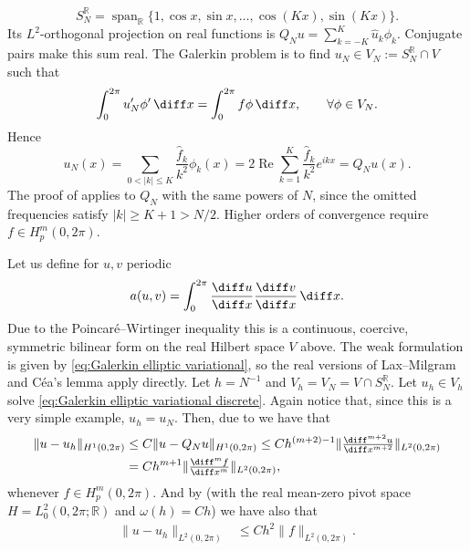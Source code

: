 \begin{example}
\begin{equation*}
        S_N^{\mathbb R}=\operatorname{span}_{\mathbb R}\{1,\cos x,\sin x,\dots,\cos(Kx),\sin(Kx)\}.
    \end{equation*}
    Its $L^2$-orthogonal projection on real functions is $Q_Nu=\sum_{k=-K}^K\hat u_k\phi_k$. Conjugate pairs make this sum real. The Galerkin problem is to find $u_N\in V_N:=S_N^{\mathbb R}\cap V$ such that
    \begin{equation*}
        \int_0^{2\pi}u_N'\phi'\,\diff x=\int_0^{2\pi}f\phi\,\diff x,
        \qquad\forall\phi\in V_N.
    \end{equation*}
    Hence
    \begin{equation*}
        u_N(x)=\sum_{0<|k|\le K}\frac{\hat f_k}{k^2}\phi_k(x)
        =2\operatorname{Re}\sum_{k=1}^K\frac{\hat f_k}{k^2}e^{ikx}=Q_Nu(x).
    \end{equation*}
    The proof of  applies to $Q_N$ with the same powers of $N$, since the omitted frequencies satisfy $|k|\ge K+1>N/2$.
    Higher orders of convergence require $f \in H^m_p(0,2\pi)$.
\end{example}

\begin{remark}
    Let us define for $u,v$ periodic
    \begin{equation*}
        a(u,v) = \int_0^{2\pi} \frac{\diff u}{\diff x}\frac{\diff v}{\diff x}\,\diff x.
    \end{equation*}
    Due to the Poincaré--Wirtinger inequality this is a continuous, coercive, symmetric bilinear form on the real Hilbert space $V$ above. The weak formulation is given by \eqref{eq:Galerkin elliptic variational}, so the real versions of Lax--Milgram and Céa's lemma apply directly.
    Let $h=N^{-1}$ and $V_h=V_N=V\cap S_N^{\mathbb R}$.
    Let $u_h \in V_h$ solve \eqref{eq:Galerkin elliptic variational discrete}.
    Again notice that, since this is a very simple example, $u_h = u_N$.
    Then, due to  we have that
    \begin{align*}
        \|u - u_h\|_{H^1(0,2\pi)} & \le C \|u - Q_Nu\|_{H^1(0,2\pi)} \le C h^{(m+2)-1} \|\tfrac{\diff^{m+2} u}{\diff x^{m+2}}\|_{L^2(0,2\pi)} \\
                                  & = C h^{m+1} \| \tfrac{\diff^m f}{\diff x^m} \|_{L^2(0,2\pi)},
    \end{align*}
    whenever $f \in H^m_p(0,2\pi)$.
    And by  (with the real mean-zero pivot space $H=L^2_0(0,2\pi;\mathbb R)$ and $\omega(h)=Ch$) we have also that
    \begin{align*}
        \|u - u_h\|_{L^2(0,2\pi)} & \le C h^{2} \| f \|_{L^2(0,2\pi)}.
    \end{align*}
\end{remark}


